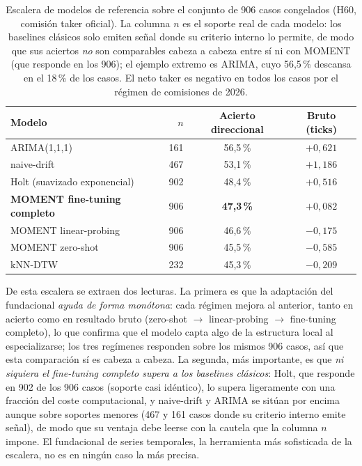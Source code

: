 \begin{table}[htbp]
\centering
\caption[Escalera de modelos de referencia]{Escalera de modelos de referencia sobre el
conjunto de 906 casos congelados (H60, comisión taker oficial). La columna $n$ es el
soporte real de cada modelo: los baselines clásicos solo emiten señal donde su criterio
interno lo permite, de modo que sus aciertos \emph{no} son comparables cabeza a cabeza
entre sí ni con MOMENT (que responde en los 906); el ejemplo extremo es ARIMA, cuyo
56,5\,\% descansa en el 18\,\% de los casos. El neto taker es negativo en todos los
casos por el régimen de comisiones de 2026.}
\label{tab::escalera}
\begin{tabular}{lrcc}
\toprule
Modelo & $n$ & Acierto direccional & Bruto (ticks) \\
\midrule
ARIMA(1,1,1) & 161 & 56,5\,\% & $+0{,}621$ \\
naive-drift & 467 & 53,1\,\% & $+1{,}186$ \\
Holt (suavizado exponencial) & 902 & 48,4\,\% & $+0{,}516$ \\
\textbf{MOMENT fine-tuning completo} & 906 & \textbf{47,3\,\%} & $+0{,}082$ \\
MOMENT linear-probing & 906 & 46,6\,\% & $-0{,}175$ \\
MOMENT zero-shot & 906 & 45,5\,\% & $-0{,}585$ \\
kNN-DTW & 232 & 45,3\,\% & $-0{,}209$ \\
\bottomrule
\end{tabular}
\end{table}

De esta escalera se extraen dos lecturas. La primera es que la adaptación del
fundacional \emph{ayuda de forma monótona}: cada régimen mejora al anterior, tanto en
acierto como en resultado bruto (zero-shot $\to$ linear-probing $\to$ fine-tuning
completo), lo que confirma que el modelo capta algo de la estructura local al
especializarse; los tres regímenes responden sobre los mismos 906 casos, así que esta
comparación sí es cabeza a cabeza. La segunda, más importante, es que \emph{ni siquiera
el fine-tuning completo supera a los baselines clásicos}: Holt, que responde en 902 de
los 906 casos (soporte casi idéntico), lo supera ligeramente con una fracción del coste
computacional, y naive-drift y ARIMA se sitúan por encima aunque sobre soportes menores
(467 y 161 casos donde su criterio interno emite señal), de modo que su ventaja debe
leerse con la cautela que la columna $n$ impone. El fundacional de series temporales, la
herramienta más sofisticada de la escalera, no es en ningún caso la más precisa.

